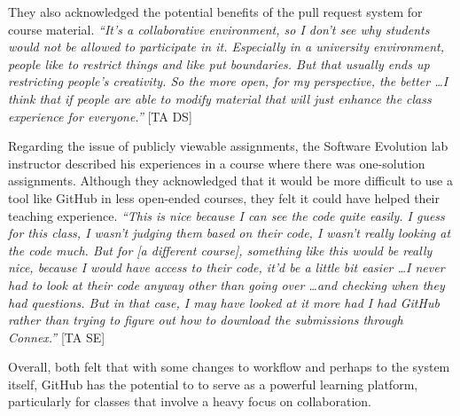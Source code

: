 They also acknowledged the potential benefits of the pull request system for course material. \textit{``It's a collaborative environment, so I don't see why students would not be allowed to participate in it. Especially in a university environment, people like to restrict things and like put boundaries. But that usually ends up restricting people's creativity. So the more open, for my perspective, the better \ldots I think that if people are able to modify material that will just enhance the class experience for everyone.''} [TA DS]

Regarding the issue of publicly viewable assignments, the Software Evolution lab instructor described his experiences in a course where there was one-solution assignments. Although they acknowledged that it would be more difficult to use a tool like GitHub in less open-ended courses, they felt it could have helped their teaching experience. \textit{``This is nice because I can see the code quite easily. I guess for this class, I wasn't judging them based on their code, I wasn't really looking at the code much. But for [a different course], something like this would be really nice, because I would have access to their code, it'd be a little bit easier \ldots I never had to look at their code anyway other than going over \ldots and checking when they had questions. But in that case, I may have looked at it more had I had GitHub rather than trying to figure out how to download the submissions through Connex.''} [TA SE]

Overall, both felt that with some changes to workflow and perhaps to the system itself, GitHub has the potential to to serve as a powerful learning platform, particularly for classes that involve a heavy focus on collaboration.





